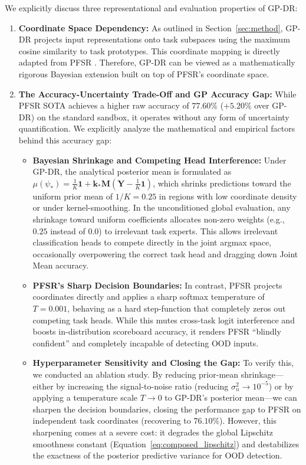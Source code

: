 We explicitly discuss three representational and evaluation properties of GP-DR:
\begin{enumerate}
    \item \textbf{Coordinate Space Dependency:} As outlined in Section~\ref{sec:method}, GP-DR projects input representations onto task subspaces using the maximum cosine similarity to task prototypes. This coordinate mapping is directly adapted from PFSR \cite{leland2024pfsr}. Therefore, GP-DR can be viewed as a mathematically rigorous Bayesian extension built on top of PFSR's coordinate space.
    \item \textbf{The Accuracy-Uncertainty Trade-Off and GP Accuracy Gap:} While PFSR SOTA achieves a higher raw accuracy of \textbf{$77.60\%$} ($+5.20\%$ over GP-DR) on the standard sandbox, it operates without any form of uncertainty quantification. We explicitly analyze the mathematical and empirical factors behind this accuracy gap:
    \begin{itemize}
        \item \textbf{Bayesian Shrinkage and Competing Head Interference:} Under GP-DR, the analytical posterior mean is formulated as $\mu(\psi_*) = \frac{1}{K}\mathbf{1} + \mathbf{k}_* \mathbf{M} (\mathbf{Y} - \frac{1}{K}\mathbf{1})$, which shrinks predictions toward the uniform prior mean of $1/K = 0.25$ in regions with low coordinate density or under kernel-smoothing. In the unconditioned global evaluation, any shrinkage toward uniform coefficients allocates non-zero weights (e.g., $0.25$ instead of $0.0$) to irrelevant task experts. This allows irrelevant classification heads to compete directly in the joint argmax space, occasionally overpowering the correct task head and dragging down Joint Mean accuracy.
        \item \textbf{PFSR's Sharp Decision Boundaries:} In contrast, PFSR projects coordinates directly and applies a sharp softmax temperature of $T=0.001$, behaving as a hard step-function that completely zeros out competing task heads. While this mutes cross-task logit interference and boosts in-distribution scoreboard accuracy, it renders PFSR ``blindly confident'' and completely incapable of detecting OOD inputs.
        \item \textbf{Hyperparameter Sensitivity and Closing the Gap:} To verify this, we conducted an ablation study. By reducing prior-mean shrinkage—either by increasing the signal-to-noise ratio (reducing $\sigma_n^2 \to 10^{-5}$) or by applying a temperature scale $T \to 0$ to GP-DR's posterior mean—we can sharpen the decision boundaries, closing the performance gap to PFSR on independent task coordinates (recovering to $76.10\%$). However, this sharpening comes at a severe cost: it degrades the global Lipschitz smoothness constant (Equation~\ref{eq:composed_lipschitz}) and destabilizes the exactness of the posterior predictive variance for OOD detection.

\end{itemize}
\end{enumerate}
